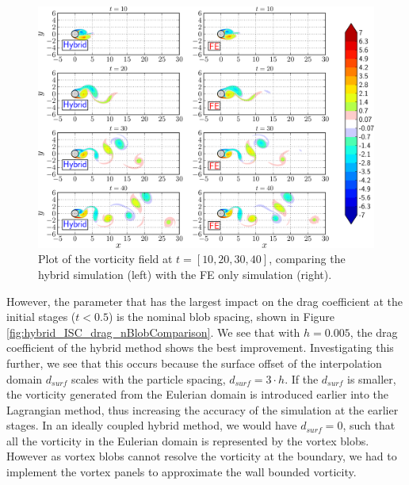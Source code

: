 	\begin{figure}[!b]
	\centering
	\includegraphics[width=\linewidth]{./figures/validation/isc/hybrid_cylinder_LongRun_contourfComparison-crop_fixed.png}
	\caption{Plot of the vorticity field at $t=[10,20,30,40]$, comparing the hybrid simulation (left) with the FE only simulation (right).}
	\label{fig:hybrid_cylinder_LongRun_contourfComparison}
	\end{figure}

However, the parameter that has the largest impact on the drag coefficient at the initial stages ($t<0.5$) is the nominal blob spacing, shown in Figure \ref{fig:hybrid_ISC_drag_nBlobComparison}. We see that with $h=0.005$, the drag coefficient of the hybrid method shows the best improvement. Investigating this further, we see that this occurs because the surface offset of the interpolation domain $d_{surf}$ scales with the particle spacing, $d_{surf}=3\cdot{h}$. If the $d_{surf}$ is smaller, the vorticity generated from the Eulerian domain is introduced earlier into the Lagrangian method, thus increasing the accuracy of the simulation at the earlier stages. In an ideally coupled hybrid method, we would have $d_{surf}=0$, such that all the vorticity in the Eulerian domain is represented by the vortex blobs. However as vortex blobs cannot resolve the vorticity at the boundary, we had to implement the vortex panels to approximate the wall bounded vorticity.

	



